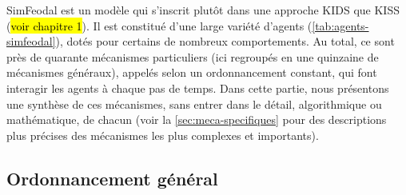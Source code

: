 SimFeodal est un modèle qui s'inscrit plutôt dans une approche KIDS que KISS (\hl{voir chapitre 1}).
Il est constitué d'une large variété d'agents (\cref{tab:agents-simfeodal}), dotés pour certains de nombreux comportements.
Au total, ce sont près de quarante mécanismes particuliers (ici regroupés en une quinzaine de mécanismes généraux), appelés selon un ordonnancement constant, qui font interagir les agents à chaque pas de temps.
Dans cette partie, nous présentons une synthèse de ces mécanismes, sans entrer dans le détail, algorithmique ou mathématique, de chacun (voir la \cref{sec:meca-specifiques} pour des descriptions plus précises des mécanismes les plus complexes et importants).

\subsection*{Ordonnancement général \label{meca-ordonancement}}

